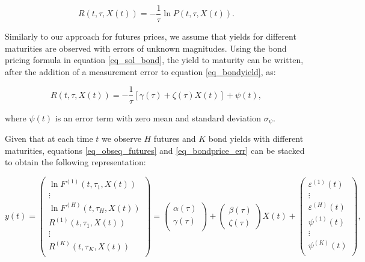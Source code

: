 \documentclass{article}
\begin{document}
\begin{equation} \label{eq_bondyield}
    R(t, \tau , X(t)) = -\frac{1}{\tau} \ln P(t, \tau , X(t)).
\end{equation}

Similarly to our approach for futures prices, we assume that yields for different maturities are observed with errors of unknown magnitudes. Using the bond pricing formula in equation \eqref{eq_sol_bond}, the yield to maturity can be written, after the addition of a measurement error to equation \eqref{eq_bondyield}, as:

\begin{equation} \label{eq_bondprice_err}
         R(t, \tau, X(t)) = - \frac{1}{\tau} \left[ \gamma(\tau) + 
    {\zeta}(\tau) {X}(t) \right] + \psi(t),
\end{equation} 

\noindent where $\psi(t)$ is an error term with zero mean and standard deviation $\sigma_\psi$.

Given that at each time $t$ we observe $H$ futures and $K$ bond yields with different maturities, equations \eqref{eq_obseq_futures} and \eqref{eq_bondprice_err} can be stacked to obtain the following representation:


\begin{equation} \label{eq_obseq_yield}
        y(t) =  \begin{pmatrix}
           \ln F^{(1)}(t, \tau_1, X(t))  \\
           \vdots 
           \\
           \ln F^{(H)}(t, \tau_H, X(t) )  \\
           R^{(1)}(t, \tau_1 , X(t) ) \\
           \vdots 
           \\
            R^{(K)}(t, \tau_K , X(t) ) \\
         \end{pmatrix} =
         \begin{pmatrix}
           \alpha(\tau)  \\
           \gamma(\tau) \\
         \end{pmatrix} + 
         \begin{pmatrix}
            {\beta}(\tau) \\
            {\zeta}(\tau) 
         \end{pmatrix} X(t) +
         \begin{pmatrix}
             \varepsilon^{(1)}(t) \\
             \vdots \\
            \varepsilon^{(H)}(t)\\
              \psi^{(1)}(t) \\
             \vdots \\
             \psi^{(K)}(t) \\
         \end{pmatrix},
\end{equation}
\end{document}
